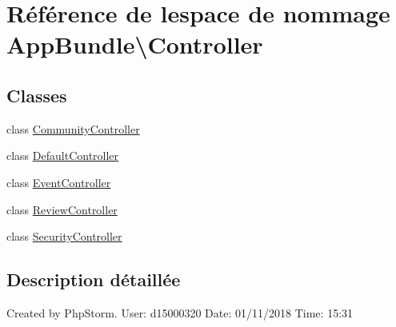 \hypertarget{namespaceAppBundle_1_1Controller}{}\section{Référence de l\textquotesingle{}espace de nommage App\+Bundle\textbackslash{}Controller}
\label{namespaceAppBundle_1_1Controller}
\subsection*{Classes}
\begin{DoxyCompactItemize}
\item 
class \hyperlink{classAppBundle_1_1Controller_1_1CommunityController}{Community\+Controller}
\item 
class \hyperlink{classAppBundle_1_1Controller_1_1DefaultController}{Default\+Controller}
\item 
class \hyperlink{classAppBundle_1_1Controller_1_1EventController}{Event\+Controller}
\item 
class \hyperlink{classAppBundle_1_1Controller_1_1ReviewController}{Review\+Controller}
\item 
class \hyperlink{classAppBundle_1_1Controller_1_1SecurityController}{Security\+Controller}
\end{DoxyCompactItemize}


\subsection{Description détaillée}
Created by Php\+Storm. User\+: d15000320 Date\+: 01/11/2018 Time\+: 15\+:31 